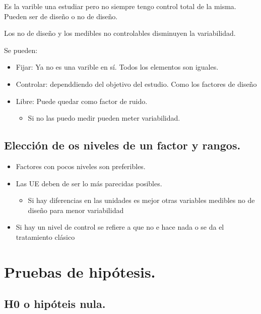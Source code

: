 \documentclass[
]{article}
\providecommand{\tightlist}{%
  \setlength{\itemsep}{0pt}\setlength{\parskip}{0pt}}
\begin{document}
Es la varible una estudiar pero no siempre tengo control total de la
misma. Pueden ser de diseño o no de diseño.

Los no de diseño y los medibles no controlables disminuyen la
variabilidad.

Se pueden:

\begin{itemize}
\item
  Fijar: Ya no es una varible en sí. Todos los elementos son iguales.
\item
  Controlar: dependdiendo del objetivo del estudio. Como los factores de
  diseño
\item
  Libre: Puede quedar como factor de ruido.

  \begin{itemize}
  \tightlist
  \item
    Si no las puedo medir pueden meter variabilidad.
  \end{itemize}
\end{itemize}

\subsection{Elección de os niveles de un factor y
rangos.}\label{elecciuxf3n-de-os-niveles-de-un-factor-y-rangos.}

\begin{itemize}
\tightlist
\item
  Factores con pocos niveles son preferibles.
\item
  Las UE deben de ser lo más parecidas posibles.

  \begin{itemize}
  \tightlist
  \item
    Si hay diferencias en las unidades es mejor otras variables medibles
    no de diseño para menor variabilidad
  \end{itemize}
\item
  Si hay un nivel de control se refiere a que no e hace nada o se da el
  tratamiento clásico
\end{itemize}

\section{Pruebas de hipótesis.}\label{pruebas-de-hipuxf3tesis.}

\subsection{H0 o hipóteis nula.}\label{h0-o-hipuxf3teis-nula.}
\end{document}
